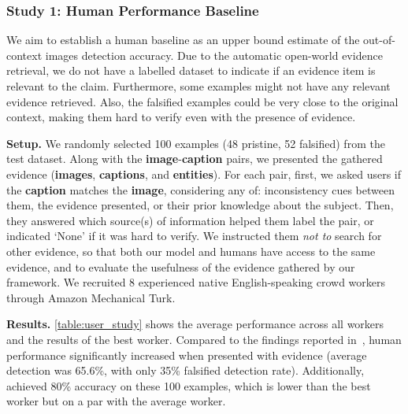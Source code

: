\subsubsection{Study 1: Human Performance Baseline}
We aim to establish a human baseline as an upper bound estimate of the out-of-context images detection accuracy. Due to the automatic open-world evidence retrieval, we do not have a labelled dataset to indicate if an evidence item is relevant to the claim. Furthermore, some examples might not have any relevant evidence retrieved. Also, the falsified examples could be very close to the original context, making them hard to verify even with the presence of evidence.

\textbf{Setup.} We randomly selected 100 examples (48 pristine, 52 falsified) from the test dataset. Along with the \textbf{\textcolor{myOrange}{image}}-\textbf{\textcolor{myblue}{caption}} pairs, we presented the gathered evidence (\textbf{\textcolor{myOrange}{images}}, \textbf{\textcolor{myblue}{captions}}, and \textbf{\textcolor{myblue}{entities}}). For each pair, first, we asked users if the \textbf{\textcolor{myblue}{caption}} matches the \textbf{\textcolor{myOrange}{image}}, considering any of: inconsistency cues between them, the evidence presented, or their prior knowledge about the subject. Then, they answered which source(s) of information helped them label the pair, or indicated `None' if it was hard to verify. 
We instructed them \textit{not to} search for other evidence, so that both our model and humans have access to the same evidence, and to evaluate the usefulness of the evidence gathered by our framework. We recruited 8 experienced native English-speaking crowd workers through Amazon Mechanical Turk.  

\textbf{Results.}
\autoref{table:user_study} shows the average performance across all workers and the results of the best worker.   
Compared to the findings reported in~\cite{luo2021newsclippings}, human performance significantly increased when presented with evidence (average detection was 65.6\%, with only 35\% falsified detection rate). Additionally, \model{} achieved 80\% accuracy on these 100 examples, which is lower than the best worker but on a par with the average worker. 

